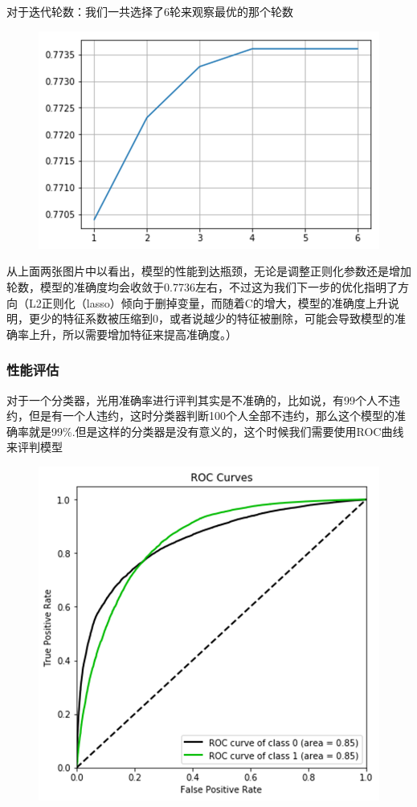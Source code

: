 \documentclass[12pt]{article}
\begin{document}
\begin{flushleft}
	\noindent\qquad  对于迭代轮数：我们一共选择了6轮来观察最优的那个轮数
\end{flushleft}

\begin{figure}[H]
	\centering
	\includegraphics[width=0.7\linewidth]{figures/screenshot018}
	\caption{}
\end{figure}

\begin{flushleft}
	\noindent\qquad  从上面两张图片中以看出，模型的性能到达瓶颈，无论是调整正则化参数还是增加轮数，模型的准确度均会收敛于0.7736左右，不过这为我们下一步的优化指明了方向（L2正则化（lasso）倾向于删掉变量，而随着C的增大，模型的准确度上升说明，更少的特征系数被压缩到0，或者说越少的特征被删除，可能会导致模型的准确率上升，所以需要增加特征来提高准确度。）
	
\end{flushleft}

\subsubsection{性能评估}

\begin{flushleft}
	\noindent\qquad 对于一个分类器，光用准确率进行评判其实是不准确的，比如说，有99个人不违约，但是有一个人违约，这时分类器判断100个人全部不违约，那么这个模型的准确率就是99$\%$.但是这样的分类器是没有意义的，这个时候我们需要使用ROC曲线来评判模型
\end{flushleft}

\begin{figure}[H]
	\centering
	\includegraphics[width=0.7\linewidth]{figures/screenshot019}
	\caption{}
\end{figure}
\end{document}
